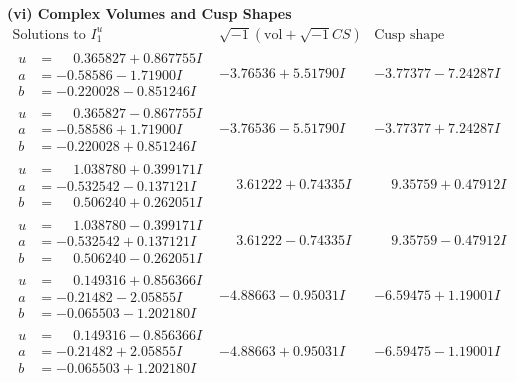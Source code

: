 \documentclass[1p]{elsarticle_modified}
\theoremstyle{definition}
\newcommand{\I}{\sqrt{-1}}
\begin{document}
\newpage\flushleft \textbf{(vi) Complex Volumes and Cusp Shapes}
$$\begin{array}{c|c|c}  
\text{Solutions to }I^u_{1}& \I (\text{vol} + \sqrt{-1}CS) & \text{Cusp shape}\\
 \hline 
\begin{aligned}
u &= \phantom{-}0.365827 + 0.867755 I \\
a &= -0.58586 - 1.71900 I \\
b &= -0.220028 - 0.851246 I\end{aligned}
 & -3.76536 + 5.51790 I & -3.77377 - 7.24287 I \\ \hline\begin{aligned}
u &= \phantom{-}0.365827 - 0.867755 I \\
a &= -0.58586 + 1.71900 I \\
b &= -0.220028 + 0.851246 I\end{aligned}
 & -3.76536 - 5.51790 I & -3.77377 + 7.24287 I \\ \hline\begin{aligned}
u &= \phantom{-}1.038780 + 0.399171 I \\
a &= -0.532542 - 0.137121 I \\
b &= \phantom{-}0.506240 + 0.262051 I\end{aligned}
 & \phantom{-}3.61222 + 0.74335 I & \phantom{-}9.35759 + 0.47912 I \\ \hline\begin{aligned}
u &= \phantom{-}1.038780 - 0.399171 I \\
a &= -0.532542 + 0.137121 I \\
b &= \phantom{-}0.506240 - 0.262051 I\end{aligned}
 & \phantom{-}3.61222 - 0.74335 I & \phantom{-}9.35759 - 0.47912 I \\ \hline\begin{aligned}
u &= \phantom{-}0.149316 + 0.856366 I \\
a &= -0.21482 - 2.05855 I \\
b &= -0.065503 - 1.202180 I\end{aligned}
 & -4.88663 - 0.95031 I & -6.59475 + 1.19001 I \\ \hline\begin{aligned}
u &= \phantom{-}0.149316 - 0.856366 I \\
a &= -0.21482 + 2.05855 I \\
b &= -0.065503 + 1.202180 I\end{aligned}
 & -4.88663 + 0.95031 I & -6.59475 - 1.19001 I \\ \hline\begin{aligned}

\end{aligned}
\end{array}$$
\end{document}
